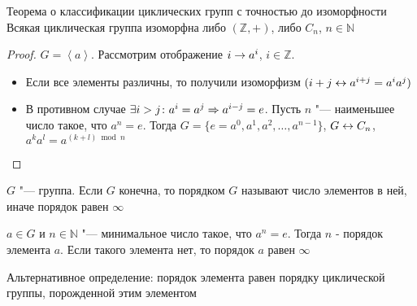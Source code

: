 \begin{theorem}{Теорема о классификации циклических групп с точностью до изоморфности}
	Всякая циклическая группа изоморфна либо $(\mathbb{Z}, +)$, либо $C_n$, $n \in \mathbb{N}$
\end{theorem}
\begin{proof}
	$G = \left<a\right>$. Рассмотрим отображение $i \rightarrow a^i$, $i \in \mathbb{Z}$.
	\begin{itemize}
	\item Если все элементы различны, то получили изоморфизм $(i + j \leftrightarrow a^{i+j} = a^i a^j)$
	\item В противном случае $\exists i > j\colon a^i = a^j \Rightarrow a^{i-j}=e$.
	      Пусть $n$ "--- наименьшее число такое, что $a^n = e$. Тогда $G = \{e = a^0, a^1, a^2, \dots, a^{n-1} \}$, $G \leftrightarrow C_n$, $a^k a^l = a^{(k+l) \bmod n}$
	\end{itemize}
\end{proof}

\begin{Def}
	$G$ "--- группа. Если $G$ конечна, то порядком $G$ называют число элементов в ней, иначе порядок равен $\infty$
\end{Def}

\begin{Def}
	$a \in G$ и $n \in \mathbb{N}$ "--- минимальное число такое, что $a^n = e$. Тогда $n$ - порядок элемента $a$. Если такого элемента нет, то порядок $a$ равен $\infty$
\end{Def}
\begin{Rem}
	Альтернативное определение: порядок элемента равен порядку циклической группы, порожденной этим элементом
\end{Rem}
